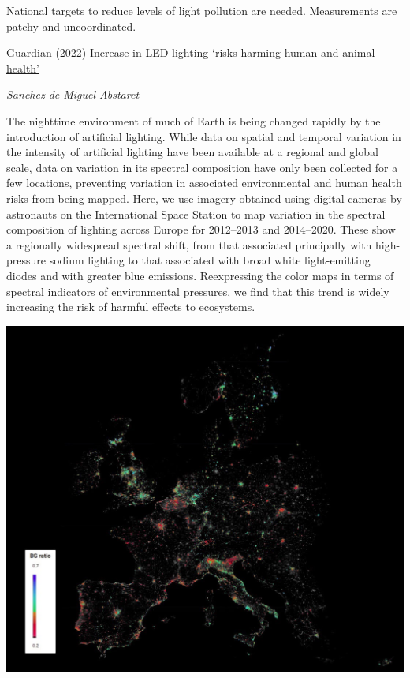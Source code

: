 \documentclass[
]{book}
\begin{document}
National targets to reduce levels of light pollution are needed.
Measurements are patchy and uncoordinated.

\href{https://www.theguardian.com/environment/2022/sep/14/increase-in-led-lighting-risks-harming-human-and-animal-health}{Guardian (2022) Increase in LED lighting `risks harming human and animal health'}

\emph{Sanchez de Miguel Abstarct}

The nighttime environment of much of Earth is being changed rapidly by the introduction of artificial lighting. While data on spatial and temporal variation in the intensity of artificial lighting have been available at a regional and global scale, data on variation in its spectral composition have only been collected for a few locations, preventing variation in associated environmental and human health risks from being mapped. Here, we use imagery obtained using digital cameras by astronauts on the International Space Station to map variation in the spectral composition of lighting across Europe for 2012--2013 and 2014--2020. These show a regionally widespread spectral shift, from that associated principally with high-pressure sodium lighting to that associated with broad white light-emitting diodes and with greater blue emissions. Reexpressing the color maps in terms of spectral indicators of environmental pressures, we find that this trend is widely increasing the risk of harmful effects to ecosystems.

\includegraphics{fig/Light_Pollution_Europe.png}
\end{document}
